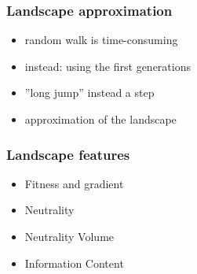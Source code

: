 \begin{frame}
	\frametitle{Landscape approximation}
	
	\begin{itemize}
		\item random walk is time-consuming
		\item instead: using the first generations
		\item ''long jump'' instead a step \cite{Kauffman.1987}
		\item approximation of the landscape
	\end{itemize}
	
\end{frame}

\begin{frame}
	\frametitle{Landscape features}
	
	\begin{itemize}
		\item Fitness and gradient
		\item Neutrality
		\item Neutrality Volume
		\item Information Content
	\end{itemize}
	
\end{frame}